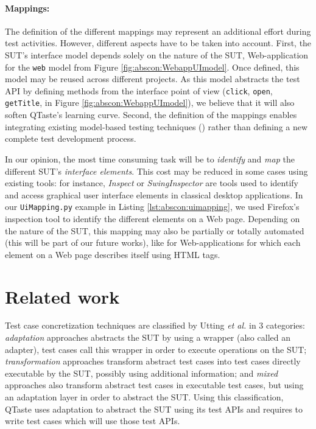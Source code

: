 \paragraph{Mappings:}

The definition of the different mappings may represent an additional effort during test activities. However, different aspects have to be taken into account. First, the SUT's interface model depends solely on the nature of the SUT, \eg Web-application for the \texttt{web} model from Figure \ref{fig:abscon:WebappUImodel}. Once defined, this model may be reused across different projects. As this model abstracts the test API by defining methods from the interface point of view (\eg \texttt{click}, \texttt{open}, \texttt{getTitle}, \etc in Figure \ref{fig:abscon:WebappUImodel}), we believe that it will also soften QTaste's learning curve. Second, the definition of the mappings enables integrating existing model-based testing techniques (\eg \cite{Utting2007,vibes}) rather than defining a new complete test development process.   

In our opinion, the most time consuming task will be to \emph{identify} and \emph{map} the different SUT's \emph{interface elements}. This cost may be reduced in some cases using existing tools: for instance, \textit{Inspect} \cite{inspect}  or \textit{SwingInspector} \cite{swinginspector} are tools used to identify and access graphical user interface elements in classical desktop applications. In our \texttt{UiMapping.py} example in Listing \ref{lst:abscon:uimapping}, we used Firefox's inspection tool to identify the different elements on a Web page. Depending on the nature of the SUT, this mapping may also be partially or totally automated (this will be part of our future works), like for Web-applications for which each element on a Web page describes itself using HTML tags. 


\section{Related work}

\label{sec:abscon:relatedwork}

Test case \gls{concretization} techniques are classified by Utting \textit{et al.} \cite{Utting2007} in 3 categories: \emph{adaptation} approaches abstracts the SUT by using a wrapper (also called an adapter), test cases call this wrapper in order to execute operations on the SUT; \emph{transformation} approaches transform abstract test cases into test cases directly executable by the SUT, possibly using  additional information; and \emph{mixed} approaches also transform abstract test cases in executable test cases, but using an adaptation layer in order to abstract the SUT. Using this classification, QTaste uses adaptation to abstract the SUT using its test APIs and requires to write test cases which will use those test APIs. 

